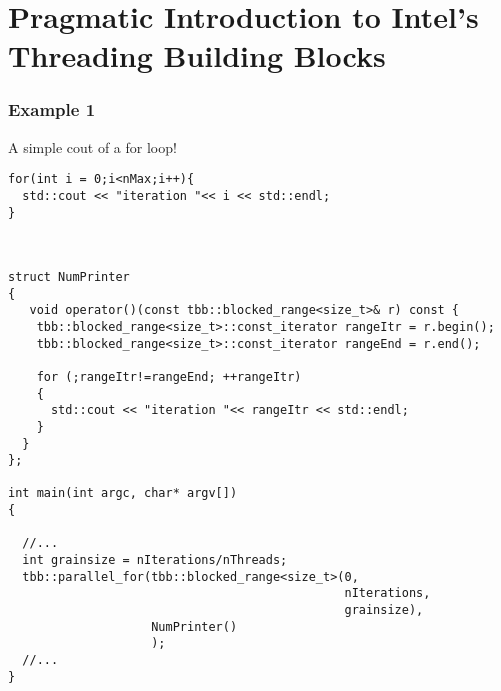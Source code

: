 \documentclass[a4paper]{article}
\begin{document}
\part*{Pragmatic Introduction to Intel's Threading Building Blocks}
\label{part:all}

 
\section*{Example 1}
\large
A simple cout of a for loop!\\
  \tiny
   \begin{lstlisting}[float=ht,caption={\large \textbf{Serial}}]
for(int i = 0;i<nMax;i++){
  std::cout << "iteration "<< i << std::endl;
}
   \end{lstlisting}
\\
   \begin{lstlisting}[float=ht,caption={\large \textbf{Parallel}}]
struct NumPrinter
{
   void operator()(const tbb::blocked_range<size_t>& r) const {
    tbb::blocked_range<size_t>::const_iterator rangeItr = r.begin();
    tbb::blocked_range<size_t>::const_iterator rangeEnd = r.end();
   
    for (;rangeItr!=rangeEnd; ++rangeItr)
    {
      std::cout << "iteration "<< rangeItr << std::endl;
    }
  }
};

int main(int argc, char* argv[])
{

  //...
  int grainsize = nIterations/nThreads;
  tbb::parallel_for(tbb::blocked_range<size_t>(0,
                                               nIterations,
                                               grainsize),
                    NumPrinter()
                    );
  //...
}
   \end{lstlisting}
  
%  
\end{document}
